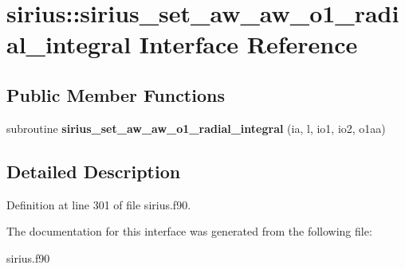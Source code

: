 \hypertarget{interfacesirius_1_1sirius__set__aw__aw__o1__radial__integral}{}\section{sirius\+:\+:sirius\+\_\+set\+\_\+aw\+\_\+aw\+\_\+o1\+\_\+radial\+\_\+integral Interface Reference}
\label{interfacesirius_1_1sirius__set__aw__aw__o1__radial__integral}
\subsection*{Public Member Functions}
\begin{DoxyCompactItemize}
\item 
\hypertarget{interfacesirius_1_1sirius__set__aw__aw__o1__radial__integral_a9f29842cd2d61784e56dab3d1f6f4821}{}subroutine {\bfseries sirius\+\_\+set\+\_\+aw\+\_\+aw\+\_\+o1\+\_\+radial\+\_\+integral} (ia, l, io1, io2, o1aa)\label{interfacesirius_1_1sirius__set__aw__aw__o1__radial__integral_a9f29842cd2d61784e56dab3d1f6f4821}

\end{DoxyCompactItemize}


\subsection{Detailed Description}


Definition at line 301 of file sirius.\+f90.



The documentation for this interface was generated from the following file\+:\begin{DoxyCompactItemize}
\item 
sirius.\+f90\end{DoxyCompactItemize}
